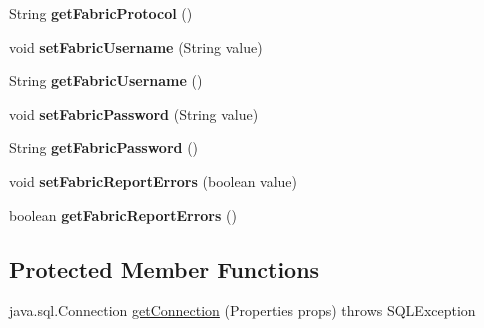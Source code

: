 \begin{DoxyCompactItemize}
\mbox{\label{classcom_1_1mysql_1_1fabric_1_1jdbc_1_1_fabric_my_s_q_l_data_source_ad62bd7815297802599993de02255376e}} 
String {\bfseries get\+Fabric\+Protocol} ()
\item 
\mbox{\label{classcom_1_1mysql_1_1fabric_1_1jdbc_1_1_fabric_my_s_q_l_data_source_a1429d634fa61d1903fec028bbdba7049}} 
void {\bfseries set\+Fabric\+Username} (String value)
\item 
\mbox{\label{classcom_1_1mysql_1_1fabric_1_1jdbc_1_1_fabric_my_s_q_l_data_source_a67f8aeb9559a405ec06640d1453b1ffc}} 
String {\bfseries get\+Fabric\+Username} ()
\item 
\mbox{\label{classcom_1_1mysql_1_1fabric_1_1jdbc_1_1_fabric_my_s_q_l_data_source_a334db78bc957b864046a30c81370f849}} 
void {\bfseries set\+Fabric\+Password} (String value)
\item 
\mbox{\label{classcom_1_1mysql_1_1fabric_1_1jdbc_1_1_fabric_my_s_q_l_data_source_ade341885a6dc49317668a54108db62ab}} 
String {\bfseries get\+Fabric\+Password} ()
\item 
\mbox{\label{classcom_1_1mysql_1_1fabric_1_1jdbc_1_1_fabric_my_s_q_l_data_source_a4ac2d3536497e26c7c35a29abf3efc85}} 
void {\bfseries set\+Fabric\+Report\+Errors} (boolean value)
\item 
\mbox{\label{classcom_1_1mysql_1_1fabric_1_1jdbc_1_1_fabric_my_s_q_l_data_source_a8df6b073d85e295e20863183d6872b17}} 
boolean {\bfseries get\+Fabric\+Report\+Errors} ()
\end{DoxyCompactItemize}
\subsection*{Protected Member Functions}
\begin{DoxyCompactItemize}
\item 
java.\+sql.\+Connection \mbox{\hyperlink{classcom_1_1mysql_1_1fabric_1_1jdbc_1_1_fabric_my_s_q_l_data_source_aaade1a90a7a191696ad1d05c3f79cc45}{get\+Connection}} (Properties props)  throws S\+Q\+L\+Exception 
\end{DoxyCompactItemize}
